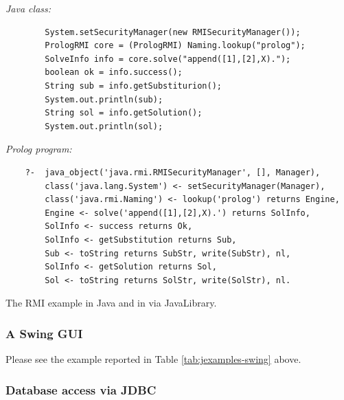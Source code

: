 \begin{table}
\textit{Java class:}
\begin{verbatim}
        System.setSecurityManager(new RMISecurityManager());
        PrologRMI core = (PrologRMI) Naming.lookup("prolog");
        SolveInfo info = core.solve("append([1],[2],X).");
        boolean ok = info.success();
        String sub = info.getSubstiturion();
        System.out.println(sub);
        String sol = info.getSolution();
        System.out.println(sol);
\end{verbatim}
\textit{Prolog program:}
\begin{verbatim}
    ?-  java_object('java.rmi.RMISecurityManager', [], Manager),
        class('java.lang.System') <- setSecurityManager(Manager),
        class('java.rmi.Naming') <- lookup('prolog') returns Engine,
        Engine <- solve('append([1],[2],X).') returns SolInfo,
        SolInfo <- success returns Ok,
        SolInfo <- getSubstitution returns Sub,
        Sub <- toString returns SubStr, write(SubStr), nl,
        SolInfo <- getSolution returns Sol,
        Sol <- toString returns SolStr, write(SolStr), nl.
\end{verbatim}

\caption{The RMI example in Java and in \tuprolog{} via JavaLibrary.}
\label{tab:rmi-example}
\end{table}

\subsubsection{A Swing GUI}

Please see the example reported in Table \ref{tab:jexamples-swing} above.

\subsubsection{Database access via JDBC}

